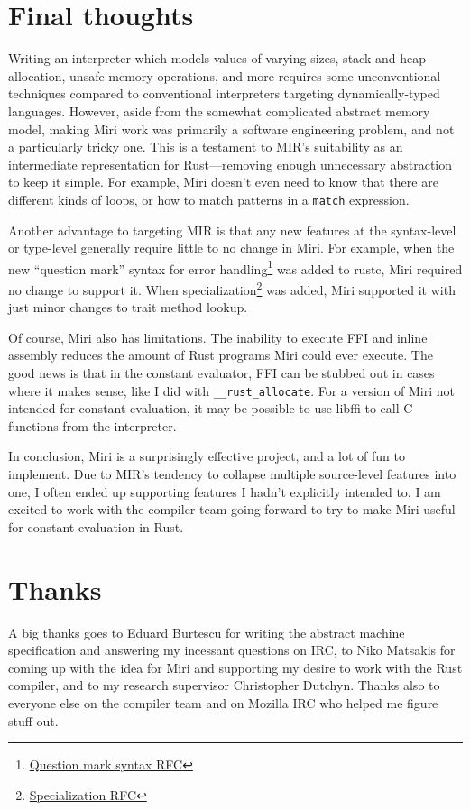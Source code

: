 \documentclass[twocolumn]{article}
\newcommand{\rust}[1]{\texttt{#1}}
\begin{document}

\section{Final thoughts}

Writing an interpreter which models values of varying sizes, stack and heap allocation, unsafe
memory operations, and more requires some unconventional techniques compared to conventional
interpreters targeting dynamically-typed languages. However, aside from the somewhat complicated
abstract memory model, making Miri work was primarily a software engineering problem, and not a
particularly tricky one. This is a testament to MIR's suitability as an intermediate representation
for Rust---removing enough unnecessary abstraction to keep it simple. For example, Miri doesn't even
need to know that there are different kinds of loops, or how to match patterns in a \rust{match}
expression.

Another advantage to targeting MIR is that any new features at the syntax-level or type-level
generally require little to no change in Miri. For example, when the new ``question mark'' syntax
for error handling\footnote{
  \href{https://github.com/rust-lang/rfcs/blob/master/text/0243-trait-based-exception-handling.md}
    {Question mark syntax RFC}}
was added to rustc, Miri required no change to support it.
When specialization\footnote{
  \href{https://github.com/rust-lang/rfcs/blob/master/text/1210-impl-specialization.md}
    {Specialization RFC}}
was added, Miri supported it with just minor changes to trait method lookup.

Of course, Miri also has limitations. The inability to execute FFI and inline assembly reduces the
amount of Rust programs Miri could ever execute. The good news is that in the constant evaluator,
FFI can be stubbed out in cases where it makes sense, like I did with \rust{__rust_allocate}. For a
version of Miri not intended for constant evaluation, it may be possible to use libffi to call C
functions from the interpreter.

In conclusion, Miri is a surprisingly effective project, and a lot of fun to implement. Due to MIR's
tendency to collapse multiple source-level features into one, I often ended up supporting features I
hadn't explicitly intended to. I am excited to work with the compiler team going forward to try to
make Miri useful for constant evaluation in Rust.


\section{Thanks}

A big thanks goes to Eduard Burtescu for writing the abstract machine specification and answering my
incessant questions on IRC, to Niko Matsakis for coming up with the idea for Miri and supporting my
desire to work with the Rust compiler, and to my research supervisor Christopher Dutchyn. Thanks
also to everyone else on the compiler team and on Mozilla IRC who helped me figure stuff out.
\end{document}
